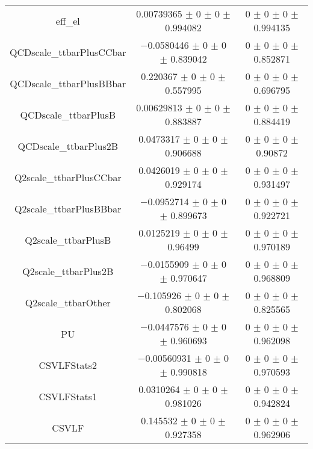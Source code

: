 \begin{table}
\begin{tabular}{ccc}
eff\_el 	& \num{0.00739365} $\pm$ \num{0} $\pm$ \num{0} $\pm$ \num{0.994082} 	& \num{0} $\pm$ \num{0} $\pm$ \num{0} $\pm$ \num{0.994135}\\
QCDscale\_ttbarPlusCCbar 	& \num{-0.0580446} $\pm$ \num{0} $\pm$ \num{0} $\pm$ \num{0.839042} 	& \num{0} $\pm$ \num{0} $\pm$ \num{0} $\pm$ \num{0.852871}\\
QCDscale\_ttbarPlusBBbar 	& \num{0.220367} $\pm$ \num{0} $\pm$ \num{0} $\pm$ \num{0.557995} 	& \num{0} $\pm$ \num{0} $\pm$ \num{0} $\pm$ \num{0.696795}\\
QCDscale\_ttbarPlusB 	& \num{0.00629813} $\pm$ \num{0} $\pm$ \num{0} $\pm$ \num{0.883887} 	& \num{0} $\pm$ \num{0} $\pm$ \num{0} $\pm$ \num{0.884419}\\
QCDscale\_ttbarPlus2B 	& \num{0.0473317} $\pm$ \num{0} $\pm$ \num{0} $\pm$ \num{0.906688} 	& \num{0} $\pm$ \num{0} $\pm$ \num{0} $\pm$ \num{0.90872}\\
Q2scale\_ttbarPlusCCbar 	& \num{0.0426019} $\pm$ \num{0} $\pm$ \num{0} $\pm$ \num{0.929174} 	& \num{0} $\pm$ \num{0} $\pm$ \num{0} $\pm$ \num{0.931497}\\
Q2scale\_ttbarPlusBBbar 	& \num{-0.0952714} $\pm$ \num{0} $\pm$ \num{0} $\pm$ \num{0.899673} 	& \num{0} $\pm$ \num{0} $\pm$ \num{0} $\pm$ \num{0.922721}\\
Q2scale\_ttbarPlusB 	& \num{0.0125219} $\pm$ \num{0} $\pm$ \num{0} $\pm$ \num{0.96499} 	& \num{0} $\pm$ \num{0} $\pm$ \num{0} $\pm$ \num{0.970189}\\
Q2scale\_ttbarPlus2B 	& \num{-0.0155909} $\pm$ \num{0} $\pm$ \num{0} $\pm$ \num{0.970647} 	& \num{0} $\pm$ \num{0} $\pm$ \num{0} $\pm$ \num{0.968809}\\
Q2scale\_ttbarOther 	& \num{-0.105926} $\pm$ \num{0} $\pm$ \num{0} $\pm$ \num{0.802068} 	& \num{0} $\pm$ \num{0} $\pm$ \num{0} $\pm$ \num{0.825565}\\
PU 	& \num{-0.0447576} $\pm$ \num{0} $\pm$ \num{0} $\pm$ \num{0.960693} 	& \num{0} $\pm$ \num{0} $\pm$ \num{0} $\pm$ \num{0.962098}\\
CSVLFStats2 	& \num{-0.00560931} $\pm$ \num{0} $\pm$ \num{0} $\pm$ \num{0.990818} 	& \num{0} $\pm$ \num{0} $\pm$ \num{0} $\pm$ \num{0.970593}\\
CSVLFStats1 	& \num{0.0310264} $\pm$ \num{0} $\pm$ \num{0} $\pm$ \num{0.981026} 	& \num{0} $\pm$ \num{0} $\pm$ \num{0} $\pm$ \num{0.942824}\\
CSVLF 	& \num{0.145532} $\pm$ \num{0} $\pm$ \num{0} $\pm$ \num{0.927358} 	& \num{0} $\pm$ \num{0} $\pm$ \num{0} $\pm$ \num{0.962906}\\

\end{tabular}
\end{table}

